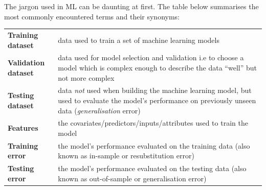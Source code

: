 \documentclass[]{book}
\begin{document}
The jargon used in ML can be daunting at first. The table below summarises the most commonly encountered terms and their synonyms:

\begin{longtable}[]{@{}ll@{}}
\toprule
\endhead
\begin{minipage}[t]{0.28\columnwidth}\raggedright
\textbf{Training dataset}\strut
\end{minipage} & \begin{minipage}[t]{0.66\columnwidth}\raggedright
data used to train a set of machine learning models\strut
\end{minipage}\tabularnewline
\begin{minipage}[t]{0.28\columnwidth}\raggedright
\textbf{Validation dataset}\strut
\end{minipage} & \begin{minipage}[t]{0.66\columnwidth}\raggedright
data used for model selection and validation i.e to choose a model which is complex enough to describe the data ``well'' but not more complex\strut
\end{minipage}\tabularnewline
\begin{minipage}[t]{0.28\columnwidth}\raggedright
\textbf{Testing dataset}\strut
\end{minipage} & \begin{minipage}[t]{0.66\columnwidth}\raggedright
data \emph{not} used when building the machine learning model, but used to evaluate the model's performance on previously unseen data (\emph{generalisation} error)\strut
\end{minipage}\tabularnewline
\begin{minipage}[t]{0.28\columnwidth}\raggedright
\textbf{Features}\strut
\end{minipage} & \begin{minipage}[t]{0.66\columnwidth}\raggedright
the covariates/predictors/inputs/attributes used to train the model\strut
\end{minipage}\tabularnewline
\begin{minipage}[t]{0.28\columnwidth}\raggedright
\textbf{Training error}\strut
\end{minipage} & \begin{minipage}[t]{0.66\columnwidth}\raggedright
the model's performance evaluated on the training data (also known as in-sample or resubstitution error)\strut
\end{minipage}\tabularnewline
\begin{minipage}[t]{0.28\columnwidth}\raggedright
\textbf{Testing error}\strut
\end{minipage} & \begin{minipage}[t]{0.66\columnwidth}\raggedright
the model's performance evaluated on the testing data (also known as out-of-sample or generalisation error)\strut
\end{minipage}\tabularnewline
\bottomrule
\end{longtable}
\end{document}
